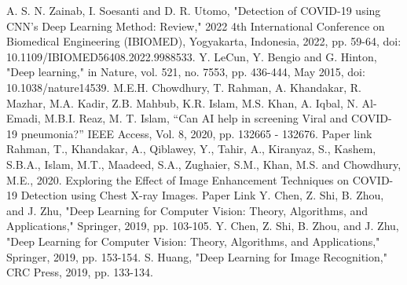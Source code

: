 \documentclass[conference]{IEEEtran}
\begin{document}
\begin{thebibliography}{00}
 A. S. N. Zainab, I. Soesanti and D. R. Utomo, "Detection of COVID-19 using CNN's Deep Learning Method: Review," 2022 4th International Conference on Biomedical Engineering (IBIOMED), Yogyakarta, Indonesia, 2022, pp. 59-64, doi: 10.1109/IBIOMED56408.2022.9988533.
 Y. LeCun, Y. Bengio and G. Hinton, "Deep learning," in Nature, vol. 521, no. 7553, pp. 436-444, May 2015, doi: 10.1038/nature14539.
 M.E.H. Chowdhury, T. Rahman, A. Khandakar, R. Mazhar, M.A. Kadir, Z.B. Mahbub, K.R. Islam, M.S. Khan, A. Iqbal, N. Al-Emadi, M.B.I. Reaz, M. T. Islam, “Can AI help in screening Viral and COVID-19 pneumonia?” IEEE Access, Vol. 8, 2020, pp. 132665 - 132676. Paper link
 Rahman, T., Khandakar, A., Qiblawey, Y., Tahir, A., Kiranyaz, S., Kashem, S.B.A., Islam, M.T., Maadeed, S.A., Zughaier, S.M., Khan, M.S. and Chowdhury, M.E., 2020. Exploring the Effect of Image Enhancement Techniques on COVID-19 Detection using Chest X-ray Images. Paper Link
 Y. Chen, Z. Shi, B. Zhou, and J. Zhu, "Deep Learning for Computer Vision: Theory, Algorithms, and Applications," Springer, 2019, pp. 103-105.
 Y. Chen, Z. Shi, B. Zhou, and J. Zhu, "Deep Learning for Computer Vision: Theory, Algorithms, and Applications," Springer, 2019, pp. 153-154.
 S. Huang, "Deep Learning for Image Recognition," CRC Press, 2019, pp. 133-134.
\end{thebibliography}
\end{document}
